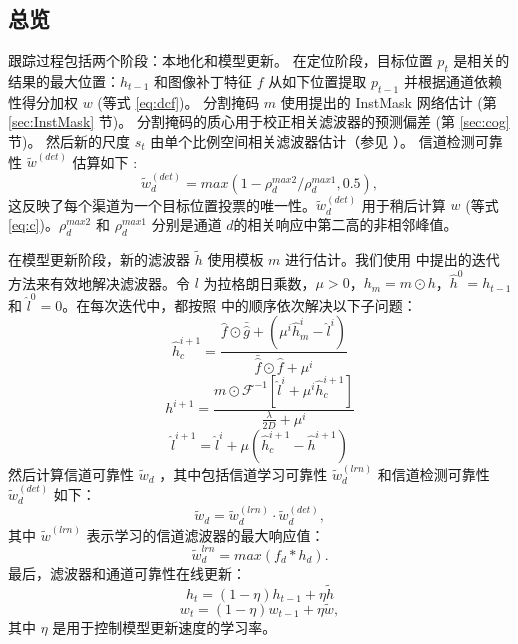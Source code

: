 \subsection{总览}
跟踪过程包括两个阶段：本地化和模型更新。
在定位阶段，目标位置 $p_t$ 是相关的结果的最大位置：$h_{t-1}$ 和图像补丁特征 $f$ 从如下位置提取 $p_{t-1}$ 并根据通道依赖性得分加权 $w$ (等式 \ref{eq:dcf})。
分割掩码 $m$ 使用提出的 InstMask 网络估计 (第 \ref{sec:InstMask} 节)。
分割掩码的质心用于校正相关滤波器的预测偏差 (第 \ref{sec:cog} 节)。
然后新的尺度 $s_t$ 由单个比例空间相关滤波器估计（参见 \cite{Danelljan2014AccurateSE}）。
信道检测可靠性 $\tilde{w}^{(det)}$ 估算如下 \cite{Lukezic2017DiscriminativeCF}:
\begin{equation} \label{eq:det}
\tilde w_d^{(det)} = max(1 - \rho_d^{max2} / \rho_d^{max1}, 0.5),
\end{equation}
这反映了每个渠道为一个目标位置投票的唯一性。$\tilde w_d^{(det)}$ 用于稍后计算 $w$ (等式 \ref{eq:c})。$\rho_d^{max2}$ 和 $\rho_d^{max1}$ 分别是通道 $d$的相关响应中第二高的非相邻峰值。

在模型更新阶段，新的滤波器 $\tilde{h}$ 使用模板 $m$ 进行估计。我们使用 \cite{Lukezic2017DiscriminativeCF} 中提出的迭代方法来有效地解决滤波器。令 $l$ 为拉格朗日乘数，$\mu > 0$，$h_m=m \odot h$，$\hat{h}^0 = h_{t-1}$ 和 $\hat{l}^0 = 0$。在每次迭代中，都按照 \cite{Lukezic2017DiscriminativeCF}中的顺序依次解决以下子问题：
\begin{equation} \label{eq:h1}
\hat{h}_c^{i+1} = \frac{\hat{f} \odot \bar{\hat{g}} +(\mu^i \hat{h}_m^i - \hat{l}^i)}{\bar{\hat{f}} \odot \hat f + \mu^i}
\end{equation}
\begin{equation}
h^{i+1} = \frac{m \odot \mathcal{F}^{-1}[\hat{l}^i + \mu^i\hat{h}_c^{i+1}]}{\frac{\lambda}{2D} + \mu^i}
\end{equation}
\begin{equation} \label{eq:h3}
\hat{l}^{i+1} = \hat{l}^i + \mu(\hat{h}_c^{i+1} - \hat{h}^{i+1})
\end{equation}
然后计算信道可靠性 $\tilde w_d$ \cite{Lukezic2017DiscriminativeCF} ，其中包括信道学习可靠性 $\tilde w_d^{(lrn)}$ 和信道检测可靠性 $\tilde w_d^{(det)}$ 如下： 
\begin{equation} \label{eq:c}
\tilde w_d = \tilde w_d^{(lrn)} \cdot \tilde w_d^{(det)},
\end{equation}
其中 $\tilde{w}^{(lrn)}$ 表示学习的信道滤波器的最大响应值：
\begin{equation} \label{eq:lrn}
\tilde{w}_d^{lrn} = max(f_d * h_d).
\end{equation}
最后，滤波器和通道可靠性在线更新：\begin{equation} \label{eq:update1}
h_t = (1 - \eta)h_{t-1} + \eta \tilde{h}
\end{equation}
\begin{equation} \label{eq:update2}
w_t = (1-\eta)w_{t-1} + \eta \tilde{w},
\end{equation}
其中 $\eta$ 是用于控制模型更新速度的学习率。

